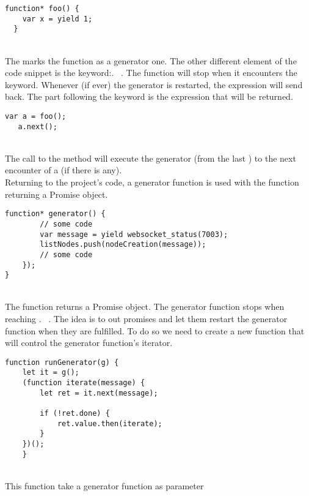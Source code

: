 \documentclass[11pt, a4paper, twoside, openright]{book} %
\begin{document}
\begin{lstlisting}[caption={Structure of a generator function}, captionpos=b]
  function* foo() {
    var x = yield 1;
  }
  \end{lstlisting}
\leavevmode \\
The \say{*} marks the function as a generator one. The other different element of
the code snippet is the keyword:. 
~\cite{yieldExpression}. The function will stop when it encounters the  keyword.
Whenever (if ever) the generator is restarted, the  expression will send  back.
The part following the  keyword is the expression that will be returned.\\

 \begin{lstlisting}[caption={Restart of a generator function}, captionpos=b]
   var a = foo();
   a.next();
 \end{lstlisting}
 \leavevmode \\
The call to the  method will execute the generator (from the last ) to the next encounter of a  (if there is any).\\
Returning to the project's code, a generator function is used with the function returning a Promise object.\\

\begin{lstlisting}[caption={Extract from the project's code}, captionpos=b]
  function* generator() {
        // some code
        var message = yield websocket_status(7003);
        listNodes.push(nodeCreation(message));
        // some code
    });
}
\end{lstlisting}
\leavevmode \\
The function  returns a Promise object. The generator function
stops when reaching . ~\cite{runGenerator}.
The idea is to  out promises and let them restart the generator function when
they are fulfilled. To do so we need to create a new function that will control the generator function's iterator.\\
\begin{lstlisting}[caption={~\cite{runGenerator}}, captionpos=b]
  function runGenerator(g) {
    let it = g();
    (function iterate(message) {
        let ret = it.next(message);

        if (!ret.done) {
            ret.value.then(iterate);
        }
    })();
    }
\end{lstlisting}
\leavevmode \\
This function take a generator function as parameter
\end{document}
